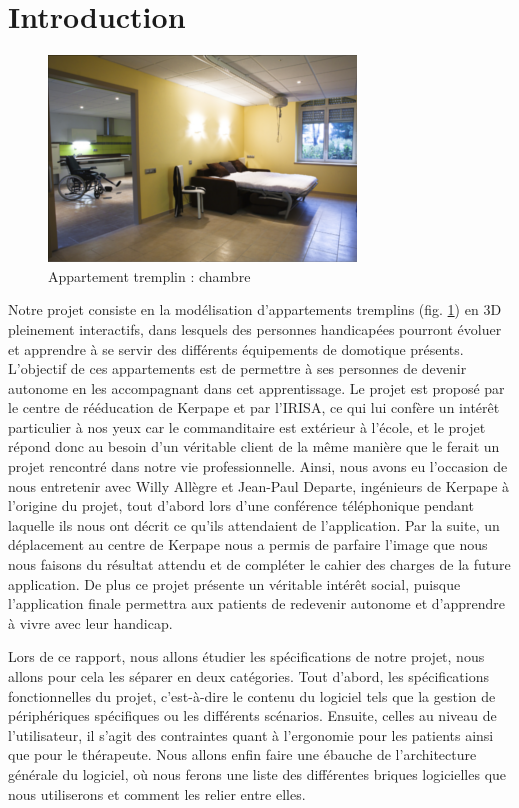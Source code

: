 \section{Introduction}

\begin{figure}
	\centering
	\includegraphics[scale=1]{1-PreEtude/img/appt_tremplin_intro.png}
	\caption{Appartement tremplin : chambre}
	\label{appart}
\end{figure}


Notre projet consiste en la modélisation d'appartements tremplins (fig. \ref{appart}) en 3D pleinement interactifs, dans lesquels des personnes handicapées pourront évoluer et apprendre à se servir des différents équipements de domotique présents. L'objectif de ces appartements est de permettre à ses personnes de devenir autonome en les accompagnant dans cet apprentissage.
Le projet est proposé par le centre de rééducation de Kerpape et par l'IRISA, ce qui lui confère un intérêt particulier à nos yeux car le commanditaire est extérieur à l'école, et le projet répond donc au besoin d'un véritable client de la même manière que le ferait un projet rencontré dans notre vie professionnelle. 
Ainsi, nous avons eu l'occasion de nous entretenir avec Willy Allègre et Jean-Paul Departe, ingénieurs de Kerpape à l'origine du projet, tout d'abord lors d'une conférence téléphonique pendant laquelle ils nous ont décrit ce qu'ils attendaient de l'application. Par la suite, un déplacement au centre de Kerpape nous a permis de parfaire l'image que nous nous faisons du résultat attendu et de compléter le cahier des charges de la future application. 
De plus ce projet présente un véritable intérêt social, puisque l'application finale permettra aux patients de redevenir autonome et d'apprendre à vivre avec leur handicap.
\newline

Lors de ce rapport, nous allons étudier les spécifications de notre projet, nous allons pour cela les séparer en deux catégories. Tout d'abord, les spécifications fonctionnelles du projet, c'est-à-dire le contenu du logiciel tels que la gestion de périphériques spécifiques ou les différents scénarios. Ensuite, celles au niveau de l'utilisateur, il s'agit des contraintes quant à l'ergonomie pour les patients ainsi que pour le thérapeute. Nous allons enfin faire une ébauche de l'architecture générale du logiciel, où nous ferons une liste des différentes briques logicielles que nous utiliserons et comment les relier entre elles.


